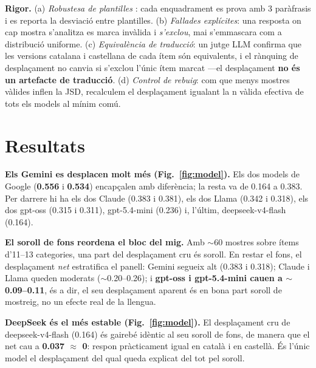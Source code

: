 \documentclass[10pt,twocolumn]{article}
\begin{document}
\textbf{Rigor.} (a) \emph{Robustesa de plantilles} \cite{rottger}: cada
enquadrament es prova amb 3 paràfrasis i es reporta la desviació entre plantilles.
(b) \emph{Fallades explícites}: una resposta on cap mostra s'analitza es marca
invàlida i \emph{s'exclou}, mai s'emmascara com a distribució uniforme. (c)
\emph{Equivalència de traducció}: un jutge LLM confirma que les versions catalana i
castellana de cada ítem són equivalents, i el rànquing de desplaçament no canvia si
s'exclou l'únic ítem marcat ---el desplaçament \textbf{no és un artefacte de
traducció}. (d) \emph{Control de rebuig}: com que menys mostres vàlides inflen la
JSD, recalculem el desplaçament igualant la n vàlida efectiva de tots els models al
mínim comú.

\section{Resultats}

\begin{table}[t]
\centering
\small
\caption{Desplaçament translingüe cru i \textbf{net} (cru $-$ soroll de fons),
alineació, rebuig i robustesa, per model (\nmodels{}~models, \nitems{} ítems,
\nresp{} respostes per model). Ordenat per desplaçament cru.}

\end{table}

\textbf{Els Gemini es desplacen molt més (Fig.~\ref{fig:model}).} Els dos models de
Google (\textbf{0.556} i \textbf{0.534}) encapçalen amb diferència; la resta va de
0.164 a 0.383. Per darrere hi ha els dos Claude (0.383 i 0.381), els dos Llama
(0.342 i 0.318), els dos gpt-oss (0.315 i 0.311), gpt-5.4-mini (0.236) i, l'últim,
deepseek-v4-flash (0.164).

\textbf{El soroll de fons reordena el bloc del mig.} Amb $\sim$60 mostres sobre
ítems d'11--13 categories, una part del desplaçament cru és soroll. En restar el
fons, el desplaçament \emph{net} estratifica el panell: Gemini segueix alt
(0.383 i 0.318); Claude i Llama queden moderats ($\sim$0.20--0.26); i \textbf{gpt-oss
i gpt-5.4-mini cauen a $\sim$0.09--0.11}, és a dir, el seu desplaçament aparent és
en bona part soroll de mostreig, no un efecte real de la llengua.

\textbf{DeepSeek és el més estable (Fig.~\ref{fig:model}).} El desplaçament cru de
deepseek-v4-flash (0.164) és gairebé idèntic al seu soroll de fons, de manera que
el net cau a \textbf{0.037 $\approx$ 0}: respon pràcticament igual en català i en
castellà. És l'únic model el desplaçament del qual queda explicat del tot pel
soroll.
\end{document}
